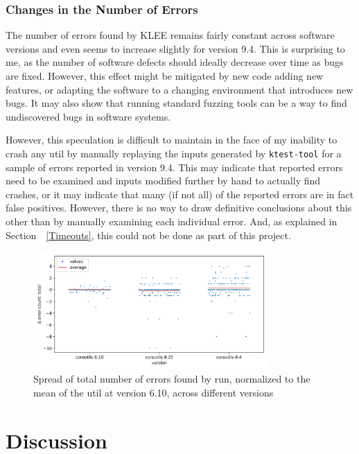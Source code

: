 \documentclass{article}
\let\savedRef=\ref
\renewcommand{\ref}{\unskip~\savedRef}
\begin{document}
\subsubsection{Changes in the Number of Errors}

The number of errors found by KLEE remains fairly constant across software versions and even seems to increase slightly for version 9.4. This is surprising to me, as the number of software defects should ideally decrease over time as bugs are fixed. However, this effect might be mitigated by new code adding new features, or adapting the software to a changing environment that introduces new bugs. It may also show that running standard fuzzing tools can be a way to find undiscovered bugs in software systems.

However, this speculation is difficult to maintain in the face of my inability to crash any util by manually replaying the inputs generated by \lstinline{ktest-tool} for a sample of errors reported in version 9.4. This may indicate that reported errors need to be examined and inputs modified further by hand to actually find crashes, or it may indicate that many (if not all) of the reported errors are in fact false positives. However, there is no way to draw definitive conclusions about this other than by manually examining each individual error. And, as explained in Section~\ref{Timeouts}, this could not be done as part of this project.

\begin{figure}[htbp]
    \centering
    \includegraphics[width=0.8\textwidth]{../plots/num_errors (total)/changes-by-version.png}
    \captionsetup{width=0.6\textwidth}
    \caption{Spread of total number of errors found by run, normalized to the mean of the util at version 6.10, across different versions}
    \label{fig:spread_across_version_errors}
\end{figure}

\section{Discussion}
\end{document}
